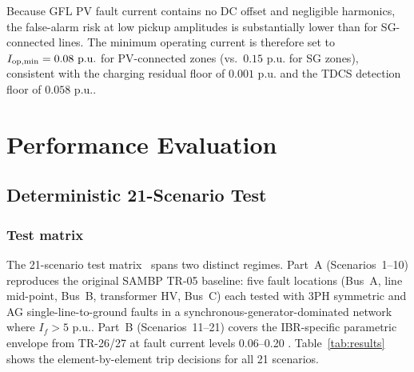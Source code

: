 \documentclass[journal,twoside,10pt]{IEEEtran}
\newcommand{\pu}{\,\text{p.u.}}
\begin{document}
Because GFL PV fault current contains no DC offset and negligible harmonics,
the false-alarm risk at low pickup amplitudes is substantially lower than for
SG-connected lines.  The minimum operating current is therefore set to
$I_{\rm op,min} = 0.08\,\pu$ for PV-connected zones (vs.\ $0.15\,\pu$ for
SG zones), consistent with the charging residual floor of $0.001\,\pu$ and
the TDCS detection floor of $0.058\,\pu$.

\section{Performance Evaluation}
\label{sec:eval}

\subsection{Deterministic 21-Scenario Test}
\label{sec:det}

\subsubsection{Test matrix}

The 21-scenario test matrix~\cite{SAMBP_TR27} spans two distinct regimes.
Part~A (Scenarios~1--10) reproduces the original SAMBP TR-05 baseline: five
fault locations (Bus~A, line mid-point, Bus~B, transformer HV, Bus~C) each
tested with 3PH symmetric and AG single-line-to-ground faults in a
synchronous-generator-dominated network where $I_f > 5\,\pu$.
Part~B (Scenarios~11--21) covers the IBR-specific parametric envelope
from TR-26/27 at fault current levels 0.06--0.20\,\pu.
Table~\ref{tab:results} shows the element-by-element trip decisions for
all 21 scenarios.
\end{document}
